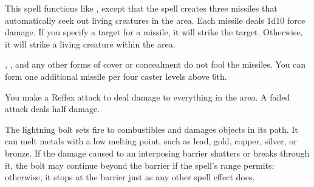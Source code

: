 \spellrng{\rngmed}
\begin{spelleffect}
  This spell functions like , except that the spell creates three missiles that automatically seek out living creatures in the area. Each missile deals 1d10 force damage. If you specify a target for a missile, it will strike the target. Otherwise, it will strike a living creature within the area.
  
  , , and any other forms of cover or concealment do not fool the missiles. You can form one additional missile per four caster levels above 6th.
\end{spelleffect}

\begin{spelleffect}
    You make a Reflex attack to deal damage to everything in the area. A failed attack deals half damage.
  \par The lightning bolt sets fire to combustibles and damages objects in its path. It can melt metals with a low melting point, such as lead, gold, copper, silver, or bronze. If the damage caused to an interposing barrier shatters or breaks through it, the bolt may continue beyond the barrier if the spell's range permits; otherwise, it stops at the barrier just as any other spell effect does.
\end{spelleffect}

